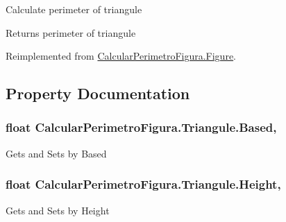 Calculate perimeter of triangule 

\begin{DoxyReturn}{Returns}
perimeter of triangule
\end{DoxyReturn}


Reimplemented from \hyperlink{class_calcular_perimetro_figura_1_1_figure_a26c46475b59d2855438e752aad406c6a}{Calcular\+Perimetro\+Figura.\+Figure}.



\subsection{Property Documentation}
\hypertarget{class_calcular_perimetro_figura_1_1_triangule_a949cca24ed5adf5856486c509dd66597}{}
\subsubsection[{Based}]{\setlength{\rightskip}{0pt plus 5cm}float Calcular\+Perimetro\+Figura.\+Triangule.\+Based\hspace{0.3cm}{\ttfamily [get]}, {\ttfamily [set]}}\label{class_calcular_perimetro_figura_1_1_triangule_a949cca24ed5adf5856486c509dd66597}


Gets and Sets by Based 

\hypertarget{class_calcular_perimetro_figura_1_1_triangule_a63a3f79718887a87d1dd5b5f1ce0ca9d}{}
\subsubsection[{Height}]{\setlength{\rightskip}{0pt plus 5cm}float Calcular\+Perimetro\+Figura.\+Triangule.\+Height\hspace{0.3cm}{\ttfamily [get]}, {\ttfamily [set]}}\label{class_calcular_perimetro_figura_1_1_triangule_a63a3f79718887a87d1dd5b5f1ce0ca9d}


Gets and Sets by Height 

\hypertarget{class_calcular_perimetro_figura_1_1_triangule_a2c9f3eb7675f21be2242cfd98040d11d}{}
